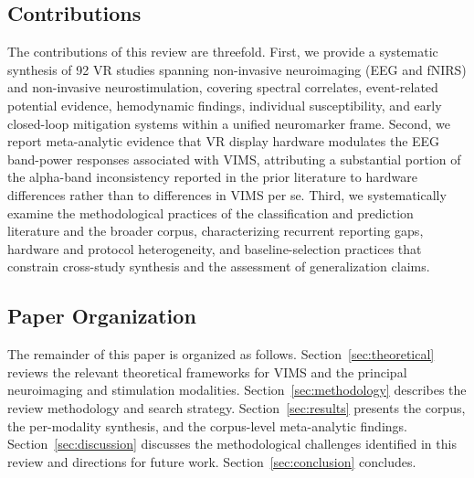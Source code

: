 \subsection{Contributions}
The contributions of this review are threefold.
First, we provide a systematic synthesis of 92 VR studies spanning non-invasive neuroimaging (EEG and fNIRS) and non-invasive neurostimulation, covering spectral correlates, event-related potential evidence, hemodynamic findings, individual susceptibility, and early closed-loop mitigation systems within a unified neuromarker frame.
Second, we report meta-analytic evidence that VR display hardware modulates the EEG band-power responses associated with VIMS, attributing a substantial portion of the alpha-band inconsistency reported in the prior literature to hardware differences rather than to differences in VIMS per se.
Third, we systematically examine the methodological practices of the classification and prediction literature and the broader corpus, characterizing recurrent reporting gaps, hardware and protocol heterogeneity, and baseline-selection practices that constrain cross-study synthesis and the assessment of generalization claims.

\subsection{Paper Organization}
\enlargethispage{\baselineskip}
The remainder of this paper is organized as follows.
Section~\ref{sec:theoretical} reviews the relevant theoretical frameworks for VIMS and the principal neuroimaging and stimulation modalities.
Section~\ref{sec:methodology} describes the review methodology and search strategy.
Section~\ref{sec:results} presents the corpus, the per-modality synthesis, and the corpus-level meta-analytic findings.
Section~\ref{sec:discussion} discusses the methodological challenges identified in this review and directions for future work.
Section~\ref{sec:conclusion} concludes.
